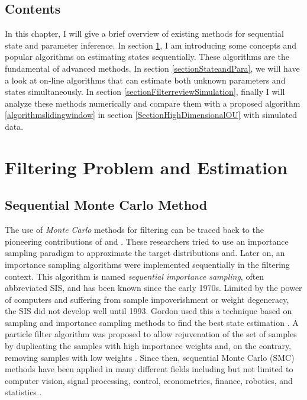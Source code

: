 \subsection*{Contents}

In this chapter, I will give a brief overview of existing methods for sequential state and parameter inference. In section \ref{sectionFiltering}, I am introducing some concepts and popular algorithms on estimating states sequentially. These algorithms are the fundamental of advanced methods. In section \ref{sectionStateandPara}, we will have a look at on-line algorithms that can estimate both unknown parameters and states simultaneously. In section \ref{sectionFilterreviewSimulation}, finally I will analyze these methods numerically and compare them with a proposed algorithm \ref{algorithmslidingwindow} in section \ref{SectionHighDimensionalOU}  with simulated data. 




\section{Filtering Problem and Estimation}\label{sectionFiltering}


\subsection{Sequential Monte Carlo Method}

The use of \textit{Monte Carlo} methods for filtering can be traced back to the pioneering contributions of  \cite{handschin1969monte} and  \cite{handschin1970monte}. These researchers tried to use an importance sampling paradigm to approximate the target distributions and. Later on, an importance sampling algorithms were implemented sequentially in the filtering context. This algorithm is named \textit{sequential importance sampling}, often abbreviated SIS, and has been known since the early 1970s. Limited by the power of computers and suffering from sample impoverishment or weight degeneracy, the SIS did not develop well until 1993. Gordon used this a technique based on sampling and importance sampling methods to find the best state estimation  \cite{gordon1993novel}. A particle filter algorithm was proposed to allow rejuvenation of the set of samples by duplicating the samples with high importance weights and, on the contrary, removing samples with low weights \cite{cappe2009inference}. Since then, sequential Monte Carlo (SMC) methods have been applied in many different fields including but not limited to computer vision, signal processing, control, econometrics, finance, robotics, and statistics \cite{smcmip2011}  \cite{ristic2004beyond}.

